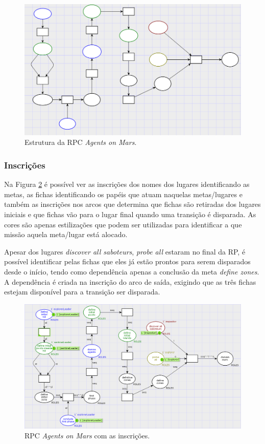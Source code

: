 \begin{figure}[ht]
\centering
\includegraphics[scale=0.55]{imagens/5-rpc-estrutura2.png}
\caption{Estrutura da RPC \textit{Agents on Mars}.}
\label{fig:5-rpc-estrutura2}
\end{figure}

\subsubsection{Inscrições}

Na Figura \ref{fig:5-rpc-incricao} é possível ver as inscrições dos nomes dos lugares identificando as metas, as fichas identificando os papéis que atuam naquelas metas/lugares e também as inscrições nos arcos que determina que fichas são retiradas dos lugares iniciais e que fichas vão para o lugar final quando uma transição é disparada. As cores são apenas estilizações que podem ser utilizadas para identificar a que missão aquela meta/lugar está alocado.

Apesar dos lugares \textit{discover all saboteurs}, \textit{probe all} estaram no final da RP, é possível identificar pelas fichas que eles já estão prontos para serem disparados desde o início, tendo como dependência apenas a conclusão da meta \textit{define zones}. A dependência é criada na inscrição do arco de saída, exigindo que as três fichas estejam disponível para a transição ser disparada.

\begin{figure}[ht]
\centering
\includegraphics[scale=0.5]{imagens/5-rpc-incricao.png}
\caption{RPC \textit{Agents on Mars} com as inscrições.}
\label{fig:5-rpc-incricao}
\end{figure}

